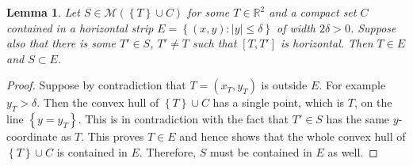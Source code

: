 \documentclass{amsart}
\newcommand{\RR}{\mathbb R}
\newcommand{\abs}[1]{\left\vert #1 \right\vert}
\newcommand{\ENCLOSE}[1]{\left\{#1\right\}}
\newcommand{\M}{\mathcal{M}}
\newtheorem{lemma}[theorem]{Lemma}
\theoremstyle{definition}
\theoremstyle{remark}
\begin{document}
\begin{lemma}\label{lm:envelope}
Let $S\in \M(\ENCLOSE{T}\cup C)$
for some $T\in \RR^2$ and a compact set $C$ contained in a horizontal strip 
$E=\ENCLOSE{(x,y)\colon \abs{y}\le \delta}$ of width $2\delta>0$.
Suppose also that there is some $T'\in S$, $T'\neq T$ 
such that $[T,T']$ is horizontal.
Then $T\in E$ and $S\subset E$.
\end{lemma}
%
\begin{proof}
  Suppose by contradiction that $T=(x_T,y_T)$ is outside $E$.
  For example $y_T>\delta$. 
  Then the convex hull of $\ENCLOSE{T}\cup C$ has a single 
  point, which is $T$, on the line $\ENCLOSE{y=y_T}$. 
  This is in contradiction with the fact that $T'\in S$ 
  has the same $y$-coordinate as $T$.
  This proves $T\in E$ and hence
  shows that the whole convex hull of 
  $\ENCLOSE{T}\cup C$ is contained in $E$. 
  Therefore, $S$ must be contained in $E$ as well.
\end{proof}
\end{document}
